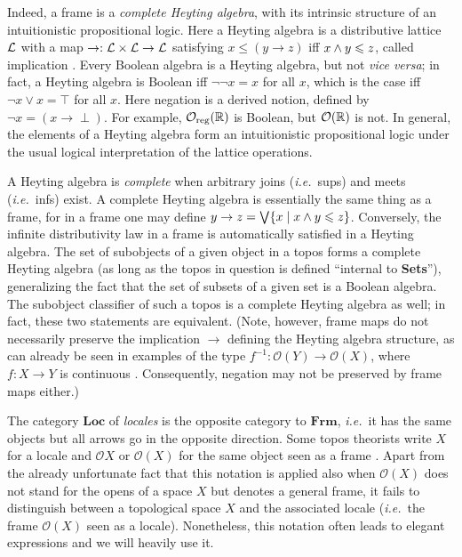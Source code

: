 \documentclass[12pt]{article}
\newcommand{\Sets}{\mbox{\textbf{Sets}}}
\newcommand{\raw}{\rightarrow} \newcommand{\rat}{\mapsto}
\newcommand{\x}{\times} \newcommand{\hb}{\hbar}
\newcommand{\inv}{^{-1}}
\newcommand{\CO}{{\mathcal O}} \newcommand{\CP}{{\mathcal P}}
\newcommand{\ie}{\textit{i.e.}}
\begin{document}
Indeed, a frame is a  {\it complete Heyting algebra}, with its intrinsic
structure of an intuitionistic propositional logic.
Here a  Heyting algebra
is a distributive lattice ${\mathcal L}$ with a map $\raw:\CL\x\CL\raw\CL$
satisfying $x\leqslant (y\raw z)$
iff $x\wedge y\leqslant z$, called implication  \cite{goldblatt84,maclanemoerdijk92,Vic:LocTopSp}.  Every Boolean algebra is
a Heyting algebra, but not {\it vice versa}; in fact, a Heyting
algebra is Boolean iff $\neg\neg x=x$ for all $x$, which is the case
iff $\neg x\vee x=\top$  for all $x$. Here negation is a derived
notion, defined by $\neg x=(x\raw\perp)$. For example,  $\CO_{\mathrm{reg}}(\R)$ is Boolean, but $\CO(\R)$ is not.
In general, the elements of a Heyting algebra
form an  intuitionistic propositional logic under the usual logical  interpretation of the
lattice operations.

A  Heyting algebra is {\it complete} when arbitrary
joins (\ie\ sups) and meets (\ie\ infs) exist.
A complete Heyting algebra is essentially the same thing as a
frame, for
 in a frame one may define $y\raw z=\bigvee\{x\mid x\wed y\leqslant z\}$.
Conversely, the infinite distributivity law in a frame is
automatically satisfied in a Heyting algebra.
The set of subobjects of a given object in a
topos forms a complete Heyting algebra (as long as the topos in question is defined ``internal to \Sets''), generalizing the fact that the set of
subsets of a given set is a Boolean algebra. The subobject classifier
of such a topos is a complete Heyting algebra as well; in fact, these two statements
are equivalent.  (Note, however, frame maps do not necessarily preserve the implication
$\raw$ defining the Heyting algebra structure, as can already be seen in
examples of the type $f\inv:\CO(Y)\raw \CO(X)$, where $f:X\raw Y$ is
continuous \cite{maclanemoerdijk92}. Consequently, negation may not be preserved by frame maps either.)


The category  $\mathbf{Loc}$ of {\it locales} is the opposite category to  $\mathbf{Frm}$, \ie\ it has the same objects but all arrows go in the opposite direction.
Some topos theorists write $X$ for a locale and $\CO X$  or $\CO(X)$ for the
same object seen as a frame  \cite{johnstone82,maclanemoerdijk92,Vic:LocTopSp}.
Apart from the already unfortunate fact that this notation is applied also when $\CO(X)$ does not stand for the opens of a space $X$ but denotes a general frame,
it fails  to distinguish between
a topological space $X$ and the associated locale (\ie\ the frame $\CO(X)$ seen as a locale).
Nonetheless, this notation often leads to elegant expressions and we will heavily use it.
\end{document}
